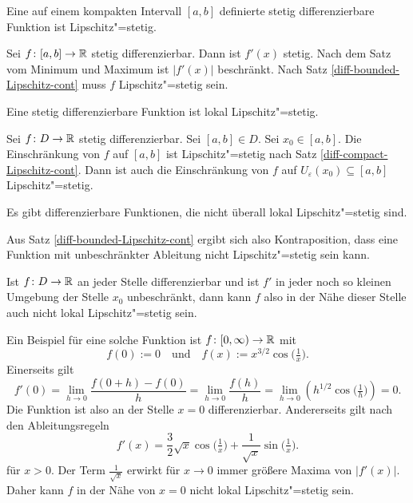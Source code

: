 \begin{Satz}\label{diff-compact-Lipschitz-cont}
Eine auf einem kompakten Intervall $[a,b]$ definierte stetig
differenzierbare Funktion ist Lipschitz"=stetig.
\end{Satz}
\begin{Beweis}
Sei $f\colon [a,b]\to\mathbb R$ stetig differenzierbar. Dann ist $f'(x)$ stetig.
Nach dem Satz vom Minimum und Maximum ist $|f'(x)|$ beschränkt. Nach
Satz \ref{diff-bounded-Lipschitz-cont} muss $f$ Lipschitz"=stetig
sein.\;\qedsymbol
\end{Beweis}

\begin{Korollar}
Eine stetig differenzierbare Funktion ist lokal Lipschitz"=stetig.
\end{Korollar}
\begin{Beweis}
Sei $f\colon D\to\mathbb R$ stetig differenzierbar. Sei $[a,b]\in D$. Sei
$x_0\in [a,b]$. Die Einschränkung von $f$ auf $[a,b]$ ist
Lipschitz"=stetig nach Satz \ref{diff-compact-Lipschitz-cont}.
Dann ist auch die Einschränkung von $f$ auf
$U_\varepsilon(x_0)\subseteq [a,b]$ Lipschitz"=stetig.\;\qedsymbol
\end{Beweis}

\begin{Satz}
Es gibt differenzierbare Funktionen, die nicht überall lokal
Lipschitz"=stetig sind.
\end{Satz}
\begin{Beweis}
Aus Satz \ref{diff-bounded-Lipschitz-cont} ergibt sich also
Kontraposition, dass eine Funktion mit unbeschränkter Ableitung
nicht Lipschitz"=stetig sein kann.

Ist $f\colon D\to\mathbb R$ an jeder Stelle differenzierbar und ist $f'$
in jeder noch so kleinen Umgebung der Stelle $x_0$ unbeschränkt, dann
kann $f$ also in der Nähe dieser Stelle auch nicht lokal
Lipschitz"=stetig sein.

Ein Beispiel für eine solche Funktion ist $f\colon{}[0,\infty)\to\mathbb R$
mit
\[f(0):=0\quad \text{und}\quad f(x):=x^{3/2}\cos\Big(\tfrac{1}{x}\Big).\]
Einerseits gilt
\[f'(0) = \lim_{h\to 0}\frac{f(0+h)-f(0)}{h} = \lim_{h\to 0}\frac{f(h)}{h}
= \lim_{h\to 0} (h^{1/2}\cos\Big(\tfrac{1}{h}\Big)) = 0.\]
Die Funktion ist also an der Stelle $x=0$ differenzierbar.
Andererseits gilt nach den Ableitungsregeln%
\[f'(x) = \frac{3}{2}\sqrt{x}\cos\Big(\tfrac{1}{x}\Big)+\frac{1}{\sqrt{x}}\sin\Big(\tfrac{1}{x}\Big).\]
für $x>0$. Der Term $\tfrac{1}{\sqrt{x}}$ erwirkt für $x\to 0$ immer
größere Maxima von $|f'(x)|$. Daher kann $f$ in der Nähe von $x=0$ nicht
lokal Lipschitz"=stetig sein.\;\qedsymbol
\end{Beweis}


